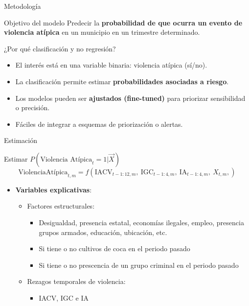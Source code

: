 \begin{frame}{Metodología}
    \small
    \begin{block}{Objetivo del modelo}
        Predecir la \textbf{probabilidad de que ocurra un evento de violencia atípica} en un municipio en un trimestre determinado.
    \end{block}

    \begin{block}{¿Por qué clasificación y no regresión?}
        \begin{itemize}
            \item El interés está en una variable binaria: violencia atípica (sí/no).
            \item La clasificación permite estimar \textbf{probabilidades asociadas a riesgo}.
            \item Los modelos pueden ser \textbf{ajustados (fine-tuned)} para priorizar sensibilidad o precisión.
            \item Fáciles de integrar a esquemas de priorización o alertas.
        \end{itemize}
    \end{block}

\end{frame}

\begin{frame}{Estimación}
    \begin{alertblock}{Estimar \( P(\text{Violencia Atípica}_{t}=1|\vec{X}) \)}
        \[
    \text{ViolenciaAtípica}_{t,m} = f\left(
        \text{IACV}_{t-1:12,m},\ 
        \text{IGC}_{t-1:4,m},\ 
        \text{IA}_{t-1:4,m},\ 
        X_{t,m},
    \right)
    \]
    \end{alertblock}

    \begin{itemize}
        \item \textbf{Variables explicativas}:

        \begin{itemize}
            \item \alert{Factores estructurales}:
            \begin{itemize}
                \footnotesize
                \item Desigualdad, presencia estatal, economías ilegales, empleo, presencia grupos armados, educación, ubicación, etc.
                \item Si tiene o no cultivos de coca en el periodo pasado
                \item Si tiene o no prescencia de un grupo criminal en el periodo pasado
            \end{itemize}

            \item \alert{Rezagos temporales de violencia}:
            \begin{itemize}
                \footnotesize
                \item IACV, IGC e IA
            \end{itemize}
        
        \end{itemize}
        \end{itemize}
\end{frame}

